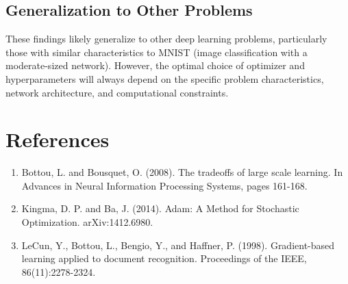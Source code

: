 \documentclass{article}
\begin{document}
\subsection{Generalization to Other Problems}
These findings likely generalize to other deep learning problems, particularly those with similar characteristics to MNIST (image classification with a moderate-sized network). However, the optimal choice of optimizer and hyperparameters will always depend on the specific problem characteristics, network architecture, and computational constraints.

\section{References}
\begin{enumerate}
    \item Bottou, L. and Bousquet, O. (2008). The tradeoffs of large scale learning. In Advances in Neural Information Processing Systems, pages 161-168.
    \item Kingma, D. P. and Ba, J. (2014). Adam: A Method for Stochastic Optimization. arXiv:1412.6980.
    \item LeCun, Y., Bottou, L., Bengio, Y., and Haffner, P. (1998). Gradient-based learning applied to document recognition. Proceedings of the IEEE, 86(11):2278-2324.
\end{enumerate}
\end{document}
